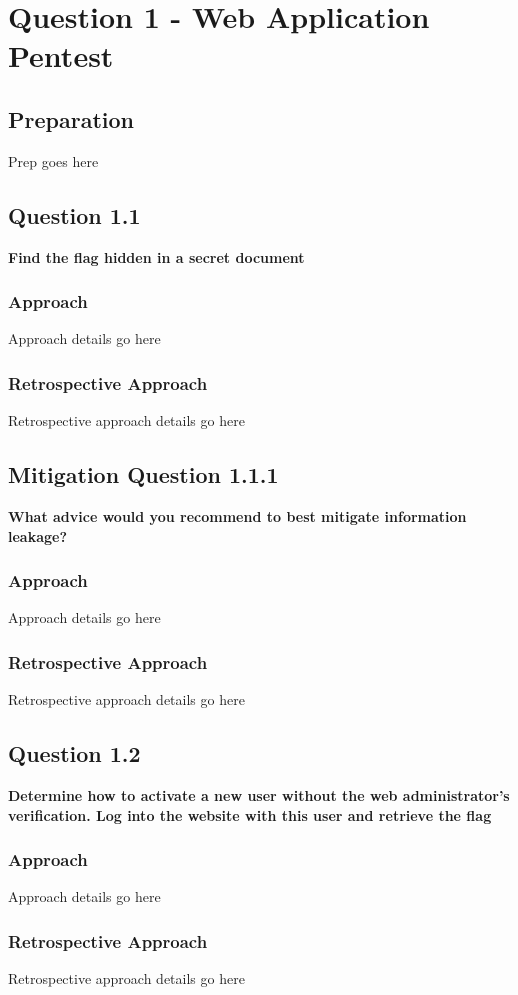 \chapter{Question 1 - Web Application Pentest}

\section{Preparation}
Prep goes here

\section{Question 1.1}
\textbf{Find the flag hidden in a secret document}
\subsection{Approach}
Approach details go here
\subsection{Retrospective Approach}
Retrospective approach details go here

\section{Mitigation Question 1.1.1}
\textbf{What advice would you recommend to best mitigate information leakage?}
\subsection{Approach}
Approach details go here
\subsection{Retrospective Approach}
Retrospective approach details go here

\section{Question 1.2}
\textbf{Determine how to activate a new user without the web administrator's
verification. Log into the website with this user and retrieve the flag}
\subsection{Approach}
Approach details go here
\subsection{Retrospective Approach}
Retrospective approach details go here

